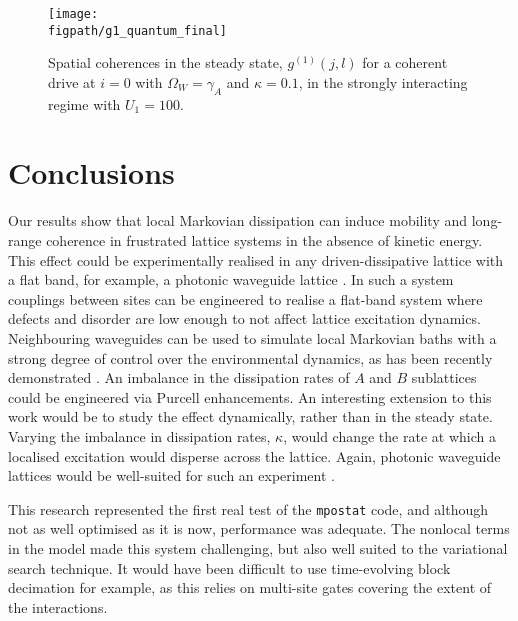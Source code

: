 \begin{figure}[ht!]
\centering 
\texttt{[image: \\figpath/g1\_quantum\_final]}
\caption{\label{fig:dim3-3}Spatial coherences in the steady state, \(g^{(1)}(j,l)\) for a coherent drive at \(i=0\) with \(\Omega_{W} = \gamma_{A}\) and \(\kappa = 0.1\), in the strongly interacting regime with \(U_{1} = 100\).}
\end{figure}

\section{Conclusions}
Our results show that local Markovian dissipation can induce mobility and long-range coherence in frustrated lattice systems in the absence of kinetic energy. This effect could be experimentally realised in any driven-dissipative lattice with a flat band, for example, a photonic waveguide lattice \cite{Mukherjee2015}. In such a system couplings between sites can be engineered to realise a flat-band system where defects and disorder are low enough to not affect lattice excitation dynamics. Neighbouring waveguides can be used to simulate local Markovian baths with a strong degree of control over the environmental dynamics, as has been recently demonstrated \cite{Mukherjee2017}. An imbalance in the dissipation rates of \(A\) and \(B\) sublattices could be engineered via Purcell enhancements. An interesting extension to this work would be to study the effect dynamically, rather than in the steady state. Varying the imbalance in dissipation rates, \(\kappa\), would change the rate at which a localised excitation would disperse across the lattice. Again, photonic waveguide lattices would be well-suited for such an experiment \cite{Mukherjee2015}. 

This research represented the first real test of the \lstinline$mpostat$ code, and although not as well optimised as it is now, performance was adequate. The nonlocal terms in the model made this system challenging, but also well suited to the variational search technique. It would have been difficult to use time-evolving block decimation for example, as this relies on multi-site gates covering the extent of the interactions.